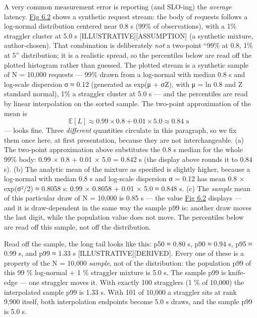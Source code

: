 A very common measurement error is reporting (and SLO-ing) the
\emph{average} latency. \hyperref[fig:6.2]{Fig 6.2} shows a synthetic request stream: the
body of requests follows a log‑normal distribution centered near 0.8 s
(99\% of observations), with a 1\% straggler cluster at 5.0 s
\mbox{{[}ILLUSTRATIVE{]}}\hspace{0pt}\mbox{{[}ASSUMPTION{]}} (a synthetic mixture, author-chosen).
That combination is deliberately \emph{not} a two‑point ``99\% at 0.8,
1\% at 5'' distribution; it is a realistic spread, so the percentiles
below are read off the plotted histogram rather than guessed. The
plotted stream is a synthetic sample of N = 10,000 requests --- 99\%
drawn from a log‑normal with median 0.8 s and log-scale dispersion σ ≈
0.12 (generated as exp(μ + σZ), with μ = ln 0.8 and Z standard normal),
1\% a straggler cluster at 5.0 s --- and the percentiles are read by
linear interpolation on the sorted sample. The two-point approximation
of the mean is \[
\mathbb{E}[L] \approx 0.99 \times 0.8 + 0.01 \times 5.0 \approx 0.84 \text{ s}
\] --- looks fine. Three \emph{different} quantities circulate in this
paragraph, so we fix them once here, at first presentation, because they
are not interchangeable. (a) The two-point approximation above
substitutes the 0.8 s median for the whole 99\% body: 0.99 × 0.8 + 0.01
× 5.0 = 0.842 s (the display above rounds it to 0.84 s). (b) The
analytic mean of the mixture as specified is slightly higher, because a
log-normal with median 0.8 s and log-scale dispersion σ = 0.12 has mean
0.8 × exp(σ²/2) ≈ 0.8058 s: 0.99 × 0.8058 + 0.01 × 5.0 ≈ 0.848 s. (c)
The \emph{sample} mean of this particular draw of N = 10,000 is 0.85 s
--- the value \hyperref[fig:6.2]{Fig 6.2} displays --- and it is draw-dependent in the same
way the sample p99 is: another draw moves the last digit, while the
population value does not move. The percentiles below are read off this
sample, not off the distribution.

Read off the sample, the long tail looks like this: p50 ≈ 0.80 s, p90 ≈
0.94 s, p95 ≈ 0.99 s, and p99 ≈ 1.33 s \mbox{{[}ILLUSTRATIVE{]}}\hspace{0pt}\mbox{{[}DERIVED{]}}.
Every one of these is a property of the N = 10,000 \emph{sample}, not of
the distribution: the population p99 of this 99 \% log‑normal + 1 \%
straggler mixture is 5.0 s. The sample p99 is knife-edge --- one
straggler moves it. With exactly 100 stragglers (1 \% of 10,000) the
interpolated sample p99 is 1.33 s. With 101 of 10,000 a straggler sits
at rank 9,900 itself, both interpolation endpoints become 5.0 s draws,
and the sample p99 is 5.0 s.

